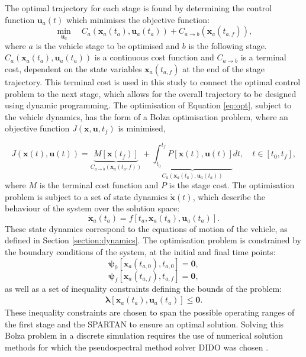 \documentclass[]{aiaa-tc}
\begin{document}
 The optimal trajectory for each stage is found by determining the control function $\textbf{u}_a(t)$ which minimises the objective function:
\begin{equation} \label{eq:opt}
\min\limits_{\textbf{u}_a} \quad C_a(\textbf{x}_a(t_a),\textbf{u}_a(t_a)) + C_{a\rightarrow  b}(\textbf{x}_a(t_{a,f})),
\end{equation}
where $a$ is the vehicle stage to be optimised and $b$ is the following stage. $ C_a(\textbf{x}_a(t_a),\textbf{u}_a(t_a))$ is a continuous cost function and $C_{{a\rightarrow b}}$ is a terminal cost, dependent on the state variables $\textbf{x}_a(t_{a,f})$ at the end of the stage trajectory. This terminal cost is used in this study to connect the optimal control problem to the next stage, which allows for the overall trajectory to be designed using dynamic programming.
The optimisation of Equation \ref{eq:opt}, subject to the vehicle dynamics, has the form of a Bolza optimisation problem, where an objective function $J(\textbf{x},\textbf{u},t_f)$ is minimised,

\begin{equation} \label{eq:cost}
J(\textbf{x}(t),\textbf{u}(t)) = \underbrace{M[\textbf{x}(t_f)]}_{C_{a\rightarrow  b}(\textbf{x}_a(t_a,{f}))} +   \underbrace{\int_{t_0}^{t_f} P[\textbf{x}(t),\textbf{u}(t)]}_{ C_a(\textbf{x}_a(t_a),\textbf{u}_a(t_a))} dt, \quad t \in [t_0,t_f],
\end{equation}
where $M$ is the terminal cost function and $P$ is the stage cost. The optimisation problem is subject to a set of state dynamics $\dot{\textbf{x}}(t)$, which describe the behaviour of the system over the solution space: 
\begin{equation} \label{eq:state}
\dot{\textbf{x}}_a(t_a) = f[t_a,\textbf{x}_a(t_a),\textbf{u}_a(t_a)].
\end{equation}
These state dynamics correspond to the equations of motion of the vehicle, as defined in Section \ref{section:dynamics}.
The optimisation problem is constrained by the boundary conditions of the system, at the initial and final time points:
\begin{equation}
\bm{\psi}_0[\textbf{x}_a(t_{a,0}), t_{a,0}] = \textbf{0},
\end{equation}
\begin{equation} \label{eq:2}
\bm{\psi}_f[\textbf{x}_a(t_{a,f}), t_{a,f}] = \textbf{0},
\end{equation}
as well as a set of inequality constraints defining the bounds of the problem:
\begin{eqnarray}
\bm{\lambda}[\textbf{x}_a(t_a),\textbf{u}_a(t_a)] \leq \textbf{0}.
\end{eqnarray}
 These inequality constraints are chosen to span the possible operating ranges of the first stage and the SPARTAN to ensure an optimal solution. 
 Solving this Bolza problem in a discrete simulation requires the use of numerical solution methods for which the pseudospectral method solver DIDO was chosen \cite{Ross}.
 
\end{document}
